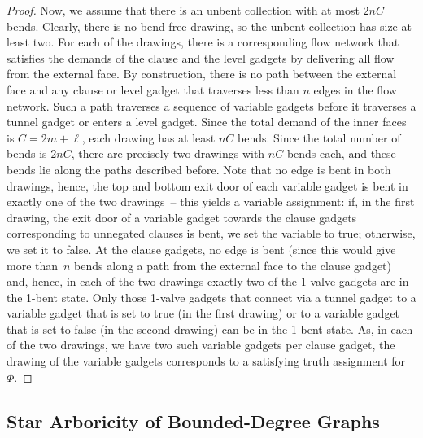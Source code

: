 \documentclass[runningheads]{llncs}
\begin{document}
\begin{proof}
    Now, we assume that there is an unbent collection with at most
    $2 n C$ bends.  Clearly, there is no bend-free drawing, so the
    unbent collection has size at least two.  For each of the
    drawings, there is a corresponding flow network that satisfies the
    demands of the clause and the level gadgets by delivering all flow
    from the external face.  By construction, there is no path between
    the external face and any clause or level gadget that traverses
    less than $n$ edges in the flow network.  Such a path traverses a
    sequence of variable gadgets before it traverses a tunnel gadget
    or enters a level gadget.  Since the total demand of the inner
    faces is $C = 2 m + \ell$, each drawing has at least $n C$ bends.
    Since the total number of bends is $2 n C$, there are precisely
    two drawings with $n C$ bends each, and these bends lie along the
    paths described before.  Note that no edge is bent in both
    drawings, hence, the top and bottom exit door of each variable
    gadget is bent in exactly one of the two drawings~-- this yields
    a variable assignment: if, in the first drawing, the exit door
    of a variable gadget towards the clause gadgets
    corresponding to unnegated clauses is bent, we set the variable
    to true; otherwise, we set it to false.  At the clause
    gadgets, no edge is bent (since this would give more than~$n$
    bends along a path from the external face to the clause gadget)
    and, hence, in each of the two drawings exactly two of the 1-valve
    gadgets are in the 1-bent state.  Only those 1-valve gadgets that
    connect via a tunnel gadget to a variable gadget that is set to
    true (in the first drawing) or to a variable gadget that is set to
    false (in the second drawing) can be in the 1-bent state.
    As, in each of the two drawings,
    we have two such variable gadgets per clause gadget,
    the drawing of the variable gadgets corresponds
    to a satisfying truth assignment for~$\Phi$.
\end{proof}

\subsection{Star Arboricity of Bounded-Degree Graphs}

\Arboricity*
\label{prop:arboricity*}
\end{document}
